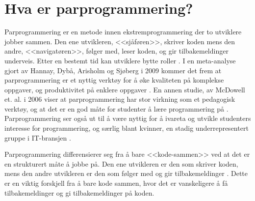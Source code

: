 \section{Hva er parprogrammering?}

% 

Parprogrammering er en metode innen ekstremprogrammering der to utviklere jobber sammen. Den ene utvikleren, <<sjåføren>>, skriver koden mens den andre, <<navigatøren>>, følger med, leser koden, og gir tilbakemeldinger underveis. Etter en bestemt tid kan utviklere bytte roller \cite{McDowell2006}. 
I en meta-analyse gjort av Hannay, Dybå, Arisholm og Sjøberg i 2009 kommer det frem at parprogrammering er et nyttig verktøy for å øke kvaliteten på komplekse oppgaver, og produktivitet på enklere oppgaver \cite{hannay2009}.
En annen studie, av McDowell et. al. i 2006 viser at parprogrammering har stor virkning som et pedagogisk verktøy, og at det er en god måte for studenter å lære programmering på \cite{McDowell2006}.
Parprogrammering ser også ut til å være nyttig for å ivareta og utvikle studenters interesse for programmering, og særlig blant kvinner, en stadig underrepresentert gruppe i IT-bransjen \cite{McDowell2006}\cite{kattan2018}.

Parprogrammering differensierer seg fra å bare <<kode-sammen>> ved at det er en strukturert måte å jobbe på. Den ene utvikleren er den som skriver koden, mens den andre utvikleren er den som følger med og gir tilbakemeldinger \cite{kattan2018}. 
Dette er en viktig forskjell fra å bare kode sammen, hvor det er vanskeligere å få tilbakemeldinger og gi tilbakemeldinger på koden.
